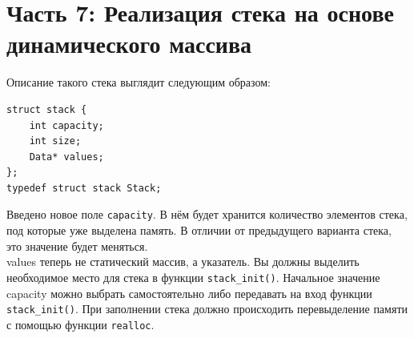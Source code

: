 \documentclass{article}
\begin{document}
\newpage
\section*{Часть 7: Реализация стека на основе динамического массива}
Описание такого стека выглядит следующим образом:
\begin{lstlisting}
struct stack {
    int capacity;
    int size;
    Data* values;
};
typedef struct stack Stack;
\end{lstlisting}
Введено новое поле \texttt{capacity}. В нём будет хранится количество элементов стека, под которые уже выделена память. В отличии от предыдущего варианта стека, это значение будет меняться. \\
values теперь не статический массив, а указатель. Вы должны выделить необходимое место для стека в функции \texttt{stack\_init()}. Начальное значение capacity можно выбрать самостоятельно либо передавать на вход функции \texttt{stack\_init()}. При заполнении стека должно происходить перевыделение памяти с помощью функции \texttt{realloc}.
\end{document}
